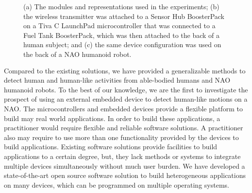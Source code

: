 \documentclass[letterpaper]{article}
\begin{document}
\begin{figure}[!t]
\centering
{}
\caption{(a) The modules and representations used in the experiments;  (b) the wireless transmitter 
was attached to a Sensor Hub BoosterPack on a Tiva C LaunchPad microcontroller that was connected to 
a Fuel Tank BoosterPack, which was then attached to the back of a human subject; and (c) the same 
device configuration was used on the back of a NAO humanoid robot.}
 \label{fig:framework}
\end{figure}

Compared to the existing solutions, we have provided a generalizable methods to detect human  and 
human-like activities from able-bodied humans and NAO humanoid robots. To the best of our 
knowledge, we are the 
first to investigate the prospect of using an external embedded device to detect human-like motions 
on a NAO. The microcontrollers and embedded devices provide a flexible platform to 
build may real world applications. In order to build these applications, a practitioner would 
require  flexible and reliable software solutions. A practitioner also may require to use more than 
one functionality provided by the devices to build applications. Existing software solutions 
provide facilities to build applications to a certain degree, but, they lack methods or systems to 
integrate multiple devices simultaneously without much user burden. We have developed  
a state-of-the-art open source software solution to build heterogeneous applications on many 
devices, which can be programmed on multiple operating systems. 
\end{document}

